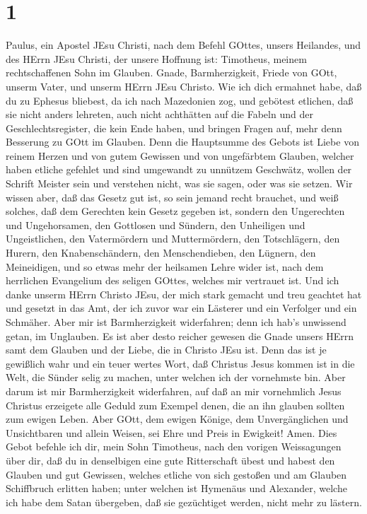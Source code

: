 \hypertarget{section}{%
\section{1}\label{section}}

 Paulus, ein Apostel JEsu Christi, nach dem Befehl GOttes,
unsers Heilandes, und des HErrn JEsu Christi, der unsere Hoffnung ist:
 Timotheus, meinem rechtschaffenen Sohn im Glauben. Gnade,
Barmherzigkeit, Friede von GOtt, unserm Vater, und unserm HErrn JEsu
Christo.  Wie ich dich ermahnet habe, daß du zu Ephesus
bliebest, da ich nach Mazedonien zog, und gebötest etlichen, daß sie
nicht anders lehreten,  auch nicht achthätten auf die Fabeln
und der Geschlechtsregister, die kein Ende haben, und bringen Fragen
auf, mehr denn Besserung zu GOtt im Glauben.  Denn die
Hauptsumme des Gebots ist Liebe von reinem Herzen und von gutem Gewissen
und von ungefärbtem Glauben,  welcher haben etliche gefehlet
und sind umgewandt zu unnützem Geschwätz,  wollen der
Schrift Meister sein und verstehen nicht, was sie sagen, oder was sie
setzen.  Wir wissen aber, daß das Gesetz gut ist, so sein
jemand recht brauchet,  und weiß solches, daß dem Gerechten
kein Gesetz gegeben ist, sondern den Ungerechten und Ungehorsamen, den
Gottlosen und Sündern, den Unheiligen und Ungeistlichen, den
Vatermördern und Muttermördern, den Totschlägern,  den
Hurern, den Knabenschändern, den Menschendieben, den Lügnern, den
Meineidigen, und so etwas mehr der heilsamen Lehre wider ist,
 nach dem herrlichen Evangelium des seligen GOttes, welches
mir vertrauet ist.  Und ich danke unserm HErrn Christo
JEsu, der mich stark gemacht und treu geachtet hat und gesetzt in das
Amt,  der ich zuvor war ein Lästerer und ein Verfolger und
ein Schmäher. Aber mir ist Barmherzigkeit widerfahren; denn ich hab's
unwissend getan, im Unglauben.  Es ist aber desto reicher
gewesen die Gnade unsers HErrn samt dem Glauben und der Liebe, die in
Christo JEsu ist.  Denn das ist je gewißlich wahr und ein
teuer wertes Wort, daß Christus Jesus kommen ist in die Welt, die Sünder
selig zu machen, unter welchen ich der vornehmste bin. 
Aber darum ist mir Barmherzigkeit widerfahren, auf daß an mir
vornehmlich Jesus Christus erzeigete alle Geduld zum Exempel denen, die
an ihn glauben sollten zum ewigen Leben.  Aber GOtt, dem
ewigen Könige, dem Unvergänglichen und Unsichtbaren und allein Weisen,
sei Ehre und Preis in Ewigkeit! Amen.  Dies Gebot befehle
ich dir, mein Sohn Timotheus, nach den vorigen Weissagungen über dir,
daß du in denselbigen eine gute Ritterschaft übest  und
habest den Glauben und gut Gewissen, welches etliche von sich gestoßen
und am Glauben Schiffbruch erlitten haben;  unter welchen
ist Hymenäus und Alexander, welche ich habe dem Satan übergeben, daß sie
gezüchtiget werden, nicht mehr zu lästern.


